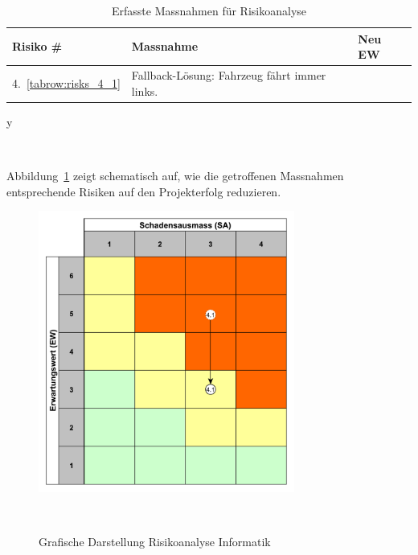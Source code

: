 \documentclass[main.tex]{subfiles} %
\begin{document}
\begin{table}[H]
    \begin{tabularx}{\textwidth}{|>{\centering\arraybackslash}p{2cm}|>{\raggedright\arraybackslash}X|>{\centering\arraybackslash}p{0.75cm}|}
        \hline
        \textbf{Risiko \#}        & \textbf{Massnahme}
                                  & \textbf{Neu EW}                              \\

        \hline
        \rowcolor{yellow!30}
        4.~\ref{tabrow:risks_4_1} & Fallback-Lösung: Fahrzeug fährt immer links.
                                  & 3                                            \\

        \hline

    \end{tabularx}y
    \caption{Erfasste Massnahmen für Risikoanalyse}~\label{tab:Erfasste_Massnahmen_info}
\end{table}

Abbildung~\ref{fig:Diagramm_Risiko_info} zeigt schematisch auf, wie die
getroffenen Massnahmen entsprechende Risiken auf den Projekterfolg reduzieren.

\begin{figure}[H]
    \centering
    \includegraphics[width=0.75\textwidth]{./fig_Risikomanagement/Diagramm_Risiko_info.pdf}
    \caption{Grafische Darstellung Risikoanalyse Informatik}~\label{fig:Diagramm_Risiko_info}
\end{figure}
\end{document}
